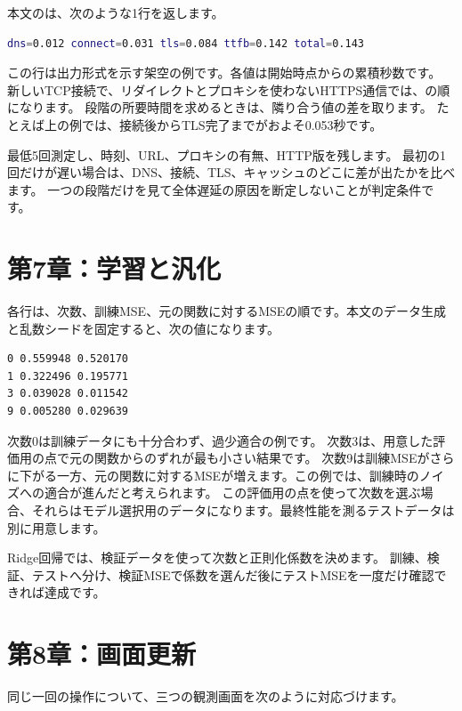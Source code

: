 本文のは、次のような1行を返します。

\begin{lstlisting}[language=bash]
dns=0.012 connect=0.031 tls=0.084 ttfb=0.142 total=0.143
\end{lstlisting}

この行は出力形式を示す架空の例です。各値は開始時点からの累積秒数です。
新しいTCP接続で、リダイレクトとプロキシを使わないHTTPS通信では、の順になります。
段階の所要時間を求めるときは、隣り合う値の差を取ります。
たとえば上の例では、接続後からTLS完了までがおよそ0.053秒です。

最低5回測定し、時刻、URL、プロキシの有無、HTTP版を残します。
最初の1回だけが遅い場合は、DNS、接続、TLS、キャッシュのどこに差が出たかを比べます。
一つの段階だけを見て全体遅延の原因を断定しないことが判定条件です。

\section{第7章：学習と汎化}

各行は、次数、訓練MSE、元の関数に対するMSEの順です。本文のデータ生成と乱数シードを固定すると、次の値になります。

\begin{lstlisting}[language=bash]
0 0.559948 0.520170
1 0.322496 0.195771
3 0.039028 0.011542
9 0.005280 0.029639
\end{lstlisting}

次数0は訓練データにも十分合わず、過少適合の例です。
次数3は、用意した評価用の点で元の関数からのずれが最も小さい結果です。
次数9は訓練MSEがさらに下がる一方、元の関数に対するMSEが増えます。この例では、訓練時のノイズへの適合が進んだと考えられます。
この評価用の点を使って次数を選ぶ場合、それらはモデル選択用のデータになります。最終性能を測るテストデータは別に用意します。

Ridge回帰では、検証データを使って次数と正則化係数を決めます。
訓練、検証、テストへ分け、検証MSEで係数を選んだ後にテストMSEを一度だけ確認できれば達成です。

\section{第8章：画面更新}

同じ一回の操作について、三つの観測画面を次のように対応づけます。

